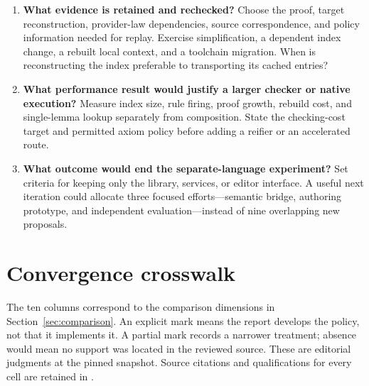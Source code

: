 \documentclass[11pt,letterpaper]{article}
\newcommand{\code}[1]{\texttt{\detokenize{#1}}}
\theoremstyle{definition}\newtheorem{definition}[proposition]{Definition}
\theoremstyle{remark}\newtheorem{remark}[proposition]{Remark}
\begin{document}
\begin{enumerate}
local analysis, summability/interchange, and coherent relational maps. Keep
the task unseen until the interface and evaluation rules are fixed.
\item \textbf{What evidence is retained and rechecked?} Choose the proof,
target reconstruction, provider-law dependencies, source correspondence, and
policy information needed for replay. Exercise simplification, a dependent
index change, a rebuilt local context, and a toolchain migration. When is
reconstructing the index preferable to transporting its cached entries?
\item \textbf{What performance result would justify a larger checker or native
execution?} Measure index size, rule firing, proof growth, rebuild cost, and
single-lemma lookup separately from composition. State the checking-cost target
and permitted axiom policy before adding a reifier or an accelerated route.
\item \textbf{What outcome would end the separate-language experiment?} Set
criteria for keeping only the library, services, or editor interface. A useful
next iteration could allocate three focused efforts---semantic bridge,
authoring prototype, and independent evaluation---instead of nine overlapping
new proposals.
\end{enumerate}

\clearpage\appendix
\section{Convergence crosswalk}\label{app:crosswalk}
The ten columns correspond to the comparison dimensions in
Section~\ref{sec:comparison}. An explicit mark means the report develops the
policy, not that it implements it. A partial mark records a narrower treatment;
absence would mean no support was located in the reviewed source. These are
editorial judgments at the pinned snapshot. Source citations and qualifications
for every cell are retained in \code{convergence.json}.

\end{document}
